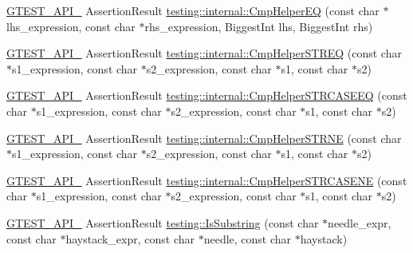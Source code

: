 \begin{DoxyCompactItemize}
\item 
\mbox{\hyperlink{_obj__test_2lib_2googletest-release-1_88_81_2googletest_2include_2gtest_2internal_2gtest-port_8h_aa73be6f0ba4a7456180a94904ce17790}{G\+T\+E\+S\+T\+\_\+\+A\+P\+I\+\_\+}} Assertion\+Result \mbox{\hyperlink{namespacetesting_1_1internal_a46582d95cbfe3d3d8f6945c9e9cd779c}{testing\+::internal\+::\+Cmp\+Helper\+EQ}} (const char $\ast$lhs\+\_\+expression, const char $\ast$rhs\+\_\+expression, Biggest\+Int lhs, Biggest\+Int rhs)
\item 
\mbox{\hyperlink{_obj__test_2lib_2googletest-release-1_88_81_2googletest_2include_2gtest_2internal_2gtest-port_8h_aa73be6f0ba4a7456180a94904ce17790}{G\+T\+E\+S\+T\+\_\+\+A\+P\+I\+\_\+}} Assertion\+Result \mbox{\hyperlink{namespacetesting_1_1internal_a711a396ed8f636ecd14a850a89d181b6}{testing\+::internal\+::\+Cmp\+Helper\+S\+T\+R\+EQ}} (const char $\ast$s1\+\_\+expression, const char $\ast$s2\+\_\+expression, const char $\ast$s1, const char $\ast$s2)
\item 
\mbox{\hyperlink{_obj__test_2lib_2googletest-release-1_88_81_2googletest_2include_2gtest_2internal_2gtest-port_8h_aa73be6f0ba4a7456180a94904ce17790}{G\+T\+E\+S\+T\+\_\+\+A\+P\+I\+\_\+}} Assertion\+Result \mbox{\hyperlink{namespacetesting_1_1internal_a30dfeb01f1bc8087c7d05205d5fa75c1}{testing\+::internal\+::\+Cmp\+Helper\+S\+T\+R\+C\+A\+S\+E\+EQ}} (const char $\ast$s1\+\_\+expression, const char $\ast$s2\+\_\+expression, const char $\ast$s1, const char $\ast$s2)
\item 
\mbox{\hyperlink{_obj__test_2lib_2googletest-release-1_88_81_2googletest_2include_2gtest_2internal_2gtest-port_8h_aa73be6f0ba4a7456180a94904ce17790}{G\+T\+E\+S\+T\+\_\+\+A\+P\+I\+\_\+}} Assertion\+Result \mbox{\hyperlink{namespacetesting_1_1internal_af2d31c77ce73e1003a64bd7ca3564bbe}{testing\+::internal\+::\+Cmp\+Helper\+S\+T\+R\+NE}} (const char $\ast$s1\+\_\+expression, const char $\ast$s2\+\_\+expression, const char $\ast$s1, const char $\ast$s2)
\item 
\mbox{\hyperlink{_obj__test_2lib_2googletest-release-1_88_81_2googletest_2include_2gtest_2internal_2gtest-port_8h_aa73be6f0ba4a7456180a94904ce17790}{G\+T\+E\+S\+T\+\_\+\+A\+P\+I\+\_\+}} Assertion\+Result \mbox{\hyperlink{namespacetesting_1_1internal_a7e31d489f06ab8f6a81a7729f0c377e7}{testing\+::internal\+::\+Cmp\+Helper\+S\+T\+R\+C\+A\+S\+E\+NE}} (const char $\ast$s1\+\_\+expression, const char $\ast$s2\+\_\+expression, const char $\ast$s1, const char $\ast$s2)
\item 
\mbox{\hyperlink{_obj__test_2lib_2googletest-release-1_88_81_2googletest_2include_2gtest_2internal_2gtest-port_8h_aa73be6f0ba4a7456180a94904ce17790}{G\+T\+E\+S\+T\+\_\+\+A\+P\+I\+\_\+}} Assertion\+Result \mbox{\hyperlink{namespacetesting_a390c4f66fe7e9098117eb77e5fffa4ad}{testing\+::\+Is\+Substring}} (const char $\ast$needle\+\_\+expr, const char $\ast$haystack\+\_\+expr, const char $\ast$needle, const char $\ast$haystack)

\end{DoxyCompactItemize}
